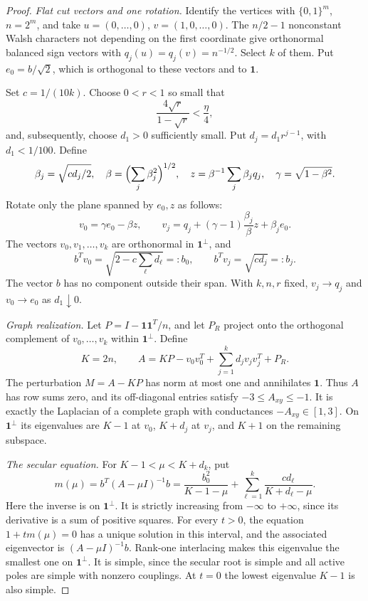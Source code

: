 \documentclass[11pt]{article}
\newcommand{\one}{\boldsymbol 1}
\begin{document}
\begin{proof}
\textit{Flat cut vectors and one rotation.}
Identify the vertices with $\{0,1\}^m$, $n=2^m$, and take
$u=(0,\ldots,0)$, $v=(1,0,\ldots,0)$. The $n/2-1$ nonconstant
Walsh characters not depending on the first coordinate give orthonormal
balanced sign vectors with $q_j(u)=q_j(v)=n^{-1/2}$. Select $k$ of
them. Put $e_0=b/\sqrt2$, which is orthogonal to these vectors and
to $\one$.

Set $c=1/(10k)$. Choose $0<r<1$ so small that
\begin{equation}\label{eq:r}
                 \frac{4\sqrt r}{1-\sqrt r}<\frac\eta4,
\end{equation}
and, subsequently, choose $d_1>0$ sufficiently small. Put
$d_j=d_1r^{j-1}$, with $d_1<1/100$. Define
\[
 \beta_j=\sqrt{cd_j/2},\quad
 \beta=\Bigl(\sum_j\beta_j^2\Bigr)^{1/2},\quad
 z=\beta^{-1}\sum_j\beta_jq_j,\quad
 \gamma=\sqrt{1-\beta^2}.
\]
Rotate only the plane spanned by $e_0,z$ as follows:
\[
 v_0=\gamma e_0-\beta z,\qquad
 v_j=q_j+(\gamma-1)\frac{\beta_j}{\beta}z+\beta_je_0.
\]
The vectors $v_0,v_1,\ldots,v_k$ are orthonormal in $\one^\perp$,
and
\begin{equation}\label{eq:couplings}
 b^Tv_0=\sqrt{2-c\sum_\ell d_\ell}=:b_0,
 \qquad b^Tv_j=\sqrt{cd_j}=:b_j.
\end{equation}
The vector $b$ has no component outside their span. With $k,n,r$
fixed, $v_j\to q_j$ and $v_0\to e_0$ as $d_1\downarrow0$.

\textit{Graph realization.}
Let $P=I-\one\one^T/n$, and let $P_R$ project onto the orthogonal
complement of $v_0,\ldots,v_k$ within $\one^\perp$. Define
\[
 K=2n,\qquad A=KP-v_0v_0^T+\sum_{j=1}^k d_jv_jv_j^T+P_R.
\]
The perturbation $M=A-KP$ has norm at most one and annihilates
$\one$. Thus $A$ has row sums zero, and its off-diagonal entries
satisfy $-3\le A_{xy}\le-1$. It is exactly the Laplacian of a
complete graph with conductances $-A_{xy}\in[1,3]$. On $\one^\perp$
its eigenvalues are $K-1$ at $v_0$, $K+d_j$ at $v_j$, and $K+1$
on the remaining subspace.

\textit{The secular equation.}
For $K-1<\mu<K+d_k$, put
\[
 m(\mu)=b^T(A-\mu I)^{-1}b
 =\frac{b_0^2}{K-1-\mu}+\sum_{\ell=1}^k
                         \frac{cd_\ell}{K+d_\ell-\mu}.
\]
Here the inverse is on $\one^\perp$. It is strictly increasing from
$-\infty$ to $+\infty$, since its derivative is a sum of positive
squares. For every $t>0$, the equation $1+tm(\mu)=0$ has a unique
solution in this interval, and the associated eigenvector is
$(A-\mu I)^{-1}b$. Rank-one interlacing makes this eigenvalue the
smallest one on $\one^\perp$. It is simple, since the secular root
is simple and all active poles are simple with nonzero couplings.
At $t=0$ the lowest eigenvalue $K-1$ is also simple.


\end{proof}
\end{document}
